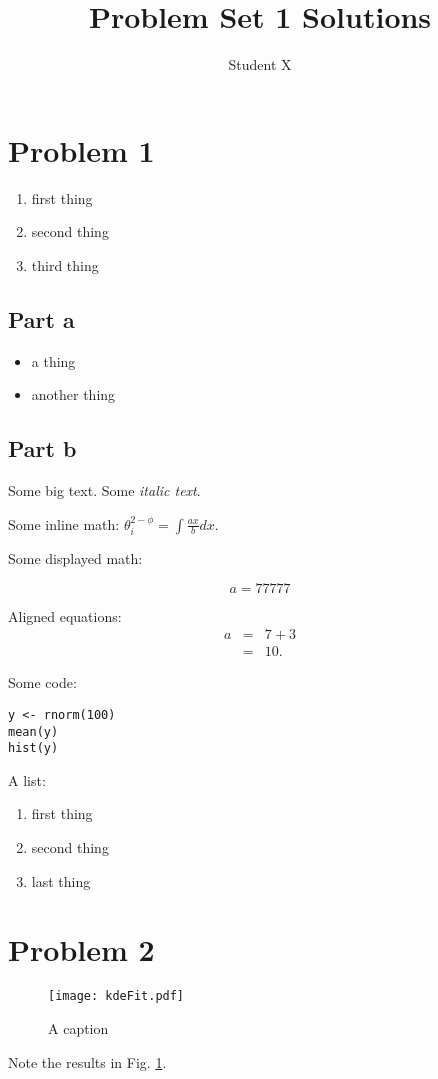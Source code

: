 \documentclass[12pt]{article}
\begin{document}
\title{Problem Set 1 Solutions}
\author{Student X}

\maketitle


\section{Problem 1}

\begin{enumerate}
\item first thing
\item second thing
\item third thing
\end{enumerate}

\subsection{Part a}

\begin{itemize}
\item a thing
\item another thing
\end{itemize}

\subsection{Part b}

Some {\large big text}.  Some {\it italic text}. 

Some inline math: $ \theta_{i}^{2-\phi} = \int \frac{ax}{b} dx $.

Some displayed math:

\[
a = 77777
\]

Aligned equations:
\begin{eqnarray*} 
a & = & 7 + 3 \\
  & = & 10.
\end{eqnarray*}

Some code:
\begin{verbatim}
y <- rnorm(100)
mean(y)
hist(y)
\end{verbatim}

A list:
\begin{enumerate}
\item first thing
\item second thing
\item last thing
\end{enumerate}


\section{Problem 2}

\begin{figure}
  \texttt{[image: kdeFit.pdf]}
  \caption{A caption}
  \label{fig:myfig}
\end{figure}

Note the results in Fig. \ref{fig:myfig}.
\end{document}

